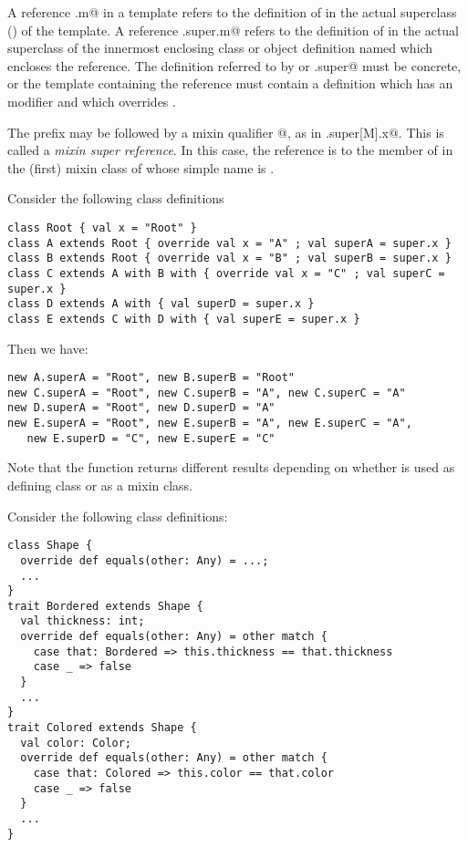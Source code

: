\documentclass[11pt]{report}
\begin{document}
A reference \verb@super.m@ in a template refers to the definition of
\verb@m@ in the actual superclass () of the
template.  A reference \verb@C.super.m@ refers to the definition of
\verb@m@ in the actual superclass of the innermost enclosing class or
object definition named \verb@C@ which encloses the reference. The
definition referred to by \verb@super@ or \verb@C.super@ must be
concrete, or the template containing the reference must contain a
definition which has an \verb@override@ modifier and which overrides
\verb@m@.

The \verb@super@ prefix may be followed by a mixin qualifier
\verb@[M]@, as in \verb@C.super[M].x@. This is called a {\em mixin
super reference}.  In this case, the reference is to the member of
\verb@x@ in the (first) mixin class of \verb@C@ whose simple name
is \verb@M@.

\example\label{ex:super}
Consider the following class definitions

\begin{verbatim}
class Root { val x = "Root" }
class A extends Root { override val x = "A" ; val superA = super.x }
class B extends Root { override val x = "B" ; val superB = super.x }
class C extends A with B with { override val x = "C" ; val superC = super.x }
class D extends A with { val superD = super.x }
class E extends C with D with { val superE = super.x }
\end{verbatim}
Then we have:
\begin{verbatim}
new A.superA = "Root", new B.superB = "Root"
new C.superA = "Root", new C.superB = "A", new C.superC = "A"
new D.superA = "Root", new D.superD = "A"
new E.superA = "Root", new E.superB = "A", new E.superC = "A",
   new E.superD = "C", new E.superE = "C"
\end{verbatim}
Note that the \verb@superB@ function returns different results
depending on whether \verb@B@ is used as defining class or as a mixin class.

\example Consider the following class definitions:
\begin{verbatim}
class Shape {
  override def equals(other: Any) = ...;
  ...
}
trait Bordered extends Shape {
  val thickness: int;
  override def equals(other: Any) = other match {
    case that: Bordered => this.thickness == that.thickness
    case _ => false
  }
  ...
}
trait Colored extends Shape {
  val color: Color;
  override def equals(other: Any) = other match {
    case that: Colored => this.color == that.color
    case _ => false
  }
  ...
}
\end{verbatim}
\end{document}
